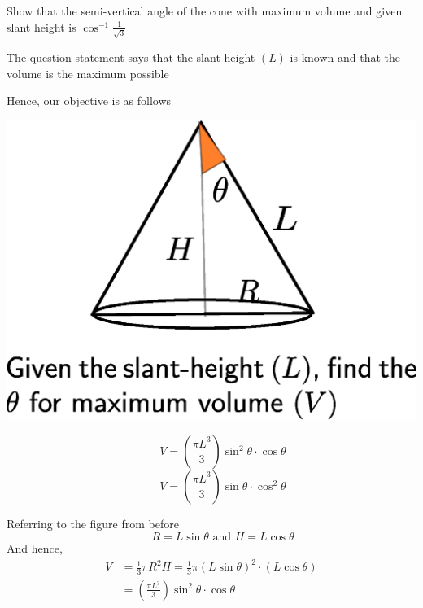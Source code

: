 \documentclass[14pt,fleqn]{extarticle}
\newcommand\ans{\cos^{-1} \frac{1}{\sqrt{3}}}
\newcommand\kexp{ \left(\frac{\pi L^3}{3} \right)}
\begin{document}
\begin{question}
	\statement 
    
    Show that the semi-vertical angle of the cone with maximum volume and given 
    slant height is $\ans$      
    
    \begin{step}
  \begin{options} 
        
    \end{options} 
     \reason 
     
     The question statement says that the slant-height $(L)$ is known and that 
     the volume is the maximum possible \newline 
     
     Hence, our objective is as follows 
     \begin{center}
\includegraphics[scale=0.45]{figure.eps}
\end{center}
\end{step}


\begin{step}
  \begin{options} 
     \correct 
     \[ \qquad V = \kexp \sin^2\theta\cdot \cos\theta \]  
     \incorrect
        \[ \qquad V = \kexp \sin\theta\cdot \cos^2\theta \]
    \end{options} 
     \reason 
       
     Referring to the figure from before 
     \[ \qquad R = L\sin\theta \text{ and } H = L\cos\theta \] 
     And hence, 
     \begin{align}
	V &= \frac{1}{3}\pi R^2 H = \frac{1}{3}\pi \left(L\sin\theta \right)^2\cdot \left( L\cos\theta \right) \\
	&= \kexp \sin^2\theta\cdot \cos\theta 
\end{align}
\end{step}


\end{question}
\end{document}
